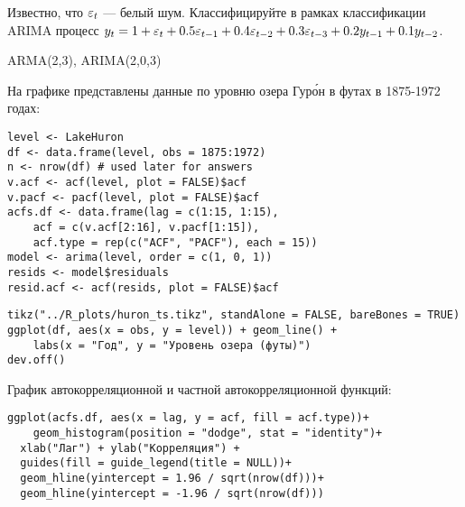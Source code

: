 \begin{problem}
Известно, что $\varepsilon_t$ — белый шум. 
Классифицируйте в рамках классификации ARIMA процесс $y_t=1+\varepsilon_t + 0.5\varepsilon_{t-1} + 0.4\varepsilon_{t-2} + 0.3\varepsilon_{t-3} + 0.2y_{t-1} + 0.1y_{t-2}$.
\begin{sol}

ARMA(2,3), ARIMA(2,0,3)
\end{sol}
\end{problem}


\begin{problem}
На графике представлены данные по уровню озера Гур\'{о}н в футах в 1875-1972 годах:

\begin{verbatim}
level <- LakeHuron
df <- data.frame(level, obs = 1875:1972)
n <- nrow(df) # used later for answers
v.acf <- acf(level, plot = FALSE)$acf
v.pacf <- pacf(level, plot = FALSE)$acf
acfs.df <- data.frame(lag = c(1:15, 1:15),
    acf = c(v.acf[2:16], v.pacf[1:15]),
    acf.type = rep(c("ACF", "PACF"), each = 15))
model <- arima(level, order = c(1, 0, 1))
resids <- model$residuals
resid.acf <- acf(resids, plot = FALSE)$acf
\end{verbatim}



\begin{verbatim}
tikz("../R_plots/huron_ts.tikz", standAlone = FALSE, bareBones = TRUE)
ggplot(df, aes(x = obs, y = level)) + geom_line() +
    labs(x = "Год", y = "Уровень озера (футы)")
dev.off()
\end{verbatim}


%




График автокорреляционной и частной автокорреляционной функций:

\begin{verbatim}
ggplot(acfs.df, aes(x = lag, y = acf, fill = acf.type))+
    geom_histogram(position = "dodge", stat = "identity")+
  xlab("Лаг") + ylab("Корреляция") +
  guides(fill = guide_legend(title = NULL))+
  geom_hline(yintercept = 1.96 / sqrt(nrow(df)))+
  geom_hline(yintercept = -1.96 / sqrt(nrow(df)))
\end{verbatim}



\end{problem}
